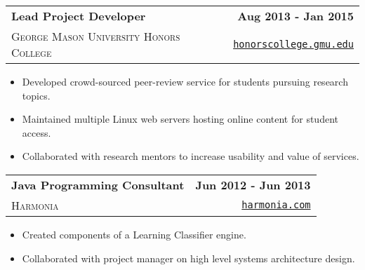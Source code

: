 \documentclass[letterpaper]{article}
\newenvironment{details}
{\begin{itemize}}
{\end{itemize}}
\begin{document}
  \noindent
  \begin{tabularx}{\textwidth}{@{}X r@{}}
    \textbf{Lead Project Developer} & \textbf{Aug 2013 - Jan 2015} \\
    \textsc{George Mason University Honors College} & \texttt{\href{http://honorscollege.gmu.edu/collegeresearch}{honorscollege.gmu.edu}}
  \end{tabularx}

  \begin{details}
  \item Developed crowd-sourced peer-review service for students pursuing research topics.
  \item Maintained multiple Linux web servers hosting online content for student access.
  \item Collaborated with research mentors to increase usability and value of services.
  \end{details}

  \noindent
  \begin{tabularx}{\textwidth}{@{}X r@{}}
    \textbf{Java Programming Consultant} & \textbf{Jun 2012 - Jun 2013} \\
    \textsc{Harmonia} & \texttt{\href{https://harmonia.com}{harmonia.com}}
  \end{tabularx}

  \begin{details}
  \item Created components of a Learning Classifier engine.
  \item Collaborated with project manager on high level systems architecture design.
  \end{details}

%
\end{document}
